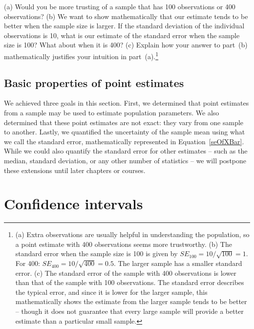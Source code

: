 \begin{exercise}
(a) Would you be more trusting of a sample that has 100 observations or 400 observations? (b) We want to show mathematically that our estimate tends to be better when the sample size is larger. If the standard deviation of the individual observations is 10, what is our estimate of the standard error when the sample size is 100? What about when it is 400? (c) Explain how your answer to part~(b) mathematically justifies your intuition in part~(a).\footnote{(a) Extra observations are usually helpful in understanding the population, so a point estimate with 400 observations seems more trustworthy. (b) The standard error when the sample size is 100 is given by $SE_{100} = 10/\sqrt{100} = 1$. For 400: $SE_{400} = 10/\sqrt{400} = 0.5$. The larger sample has a smaller standard error. (c) The standard error of the sample with 400 observations is lower than that of the sample with 100 observations. The standard error describes the typical error, and since it is lower for the larger sample, this mathematically shows the estimate from the larger sample tends to be better -- though it does not guarantee that every large sample will provide a better estimate than a particular small sample.}
\end{exercise}

\subsection{Basic properties of point estimates}

We achieved three goals in this section. First, we determined that point estimates from a sample may be used to estimate population parameters. We also determined that these point estimates are not exact: they vary from one sample to another. Lastly, we quantified the uncertainty of the sample mean using what we call the standard error, mathematically represented in Equation~\eqref{seOfXBar}. While we could also quantify the standard error for other estimates -- such as the median, standard deviation, or any other number of statistics -- we will postpone these extensions until later chapters or courses.



\section{Confidence intervals}
\label{confidenceIntervals}


